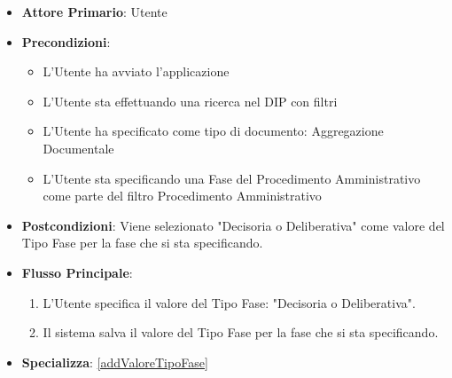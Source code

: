 \begin{itemize}
      \item \textbf{Attore Primario}: Utente
      \item \textbf{Precondizioni}: 
      \begin{itemize}
            \item L'Utente ha avviato l'applicazione
            \item L'Utente sta effettuando una ricerca nel DIP con filtri
            \item L'Utente ha specificato come tipo di documento: Aggregazione Documentale
            \item L'Utente sta specificando una Fase del Procedimento Amministrativo come parte del filtro Procedimento Amministrativo
      \end{itemize}
      \item \textbf{Postcondizioni}: Viene selezionato "Decisoria o Deliberativa" come valore del Tipo Fase per la fase che si sta specificando.
      \item \textbf{Flusso Principale}:
      \begin{enumerate}
            \item L'Utente specifica il valore del Tipo Fase: "Decisoria o Deliberativa".
            \item Il sistema salva il valore del Tipo Fase per la fase che si sta specificando.
      \end{enumerate}
      \item \textbf{Specializza}: \ref{addValoreTipoFase}
\end{itemize}

